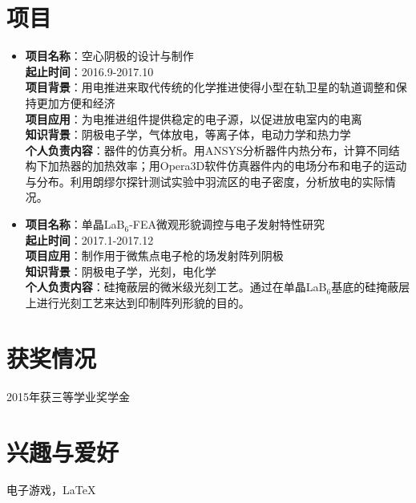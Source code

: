 \documentclass[a4paper]{article}
\begin{document}
\section{项目}
\begin{itemize}[leftmargin=*]
\item \textbf{项目名称}：空心阴极的设计与制作\\
\textbf{起止时间}：2016.9-2017.10\\
\textbf{项目背景}：用电推进来取代传统的化学推进使得小型在轨卫星的轨道调整和保持更加方便和经济\\
\textbf{项目应用}：为电推进组件提供稳定的电子源，以促进放电室内的电离\\
\textbf{知识背景}：阴极电子学，气体放电，等离子体，电动力学和热力学\\
\textbf{个人负责内容}：器件的仿真分析。用ANSYS分析器件内热分布，计算不同结构下加热器的加热效率；用Opera3D软件仿真器件内的电场分布和电子的运动与分布。利用朗缪尔探针测试实验中羽流区的电子密度，分析放电的实际情况。
\item \textbf{项目名称}：单晶LaB$_6$-FEA微观形貌调控与电子发射特性研究\\
\textbf{起止时间}：2017.1-2017.12\\
\textbf{项目应用}：制作用于微焦点电子枪的场发射阵列阴极\\
\textbf{知识背景}：阴极电子学，光刻，电化学\\
\textbf{个人负责内容}：硅掩蔽层的微米级光刻工艺。通过在单晶LaB$_6$基底的硅掩蔽层上进行光刻工艺来达到印制阵列形貌的目的。
\end{itemize}

\section{获奖情况}
2015年获三等学业奖学金

\section{兴趣与爱好}
电子游戏，LaTeX

\end{document}
